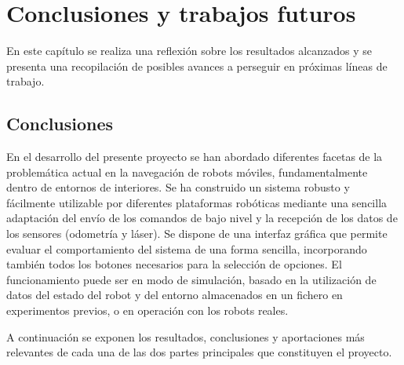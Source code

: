 
\chapter{Conclusiones y trabajos futuros}\label{ch:conclusiones}

En este capítulo se realiza una reflexión sobre los resultados alcanzados y se presenta una recopilación de posibles avances a perseguir en próximas líneas de trabajo.

\section{Conclusiones}

En el desarrollo del presente proyecto se han abordado diferentes facetas de la problemática actual en la navegación de robots móviles, fundamentalmente dentro de entornos de interiores. Se ha construido un sistema robusto y fácilmente utilizable por diferentes plataformas robóticas mediante una sencilla adaptación del envío de los comandos de bajo nivel y la recepción de los datos de los sensores (odometría y láser). Se dispone de una interfaz gráfica que permite evaluar el comportamiento del sistema de una forma sencilla, incorporando también todos los botones necesarios para la selección de opciones. El funcionamiento puede ser en modo de simulación, basado en la utilización de datos del estado del robot y del entorno almacenados en un fichero en experimentos previos, o en operación con los robots reales.

A continuación se exponen los resultados, conclusiones y aportaciones más relevantes de cada una de las dos partes principales que constituyen el proyecto.

